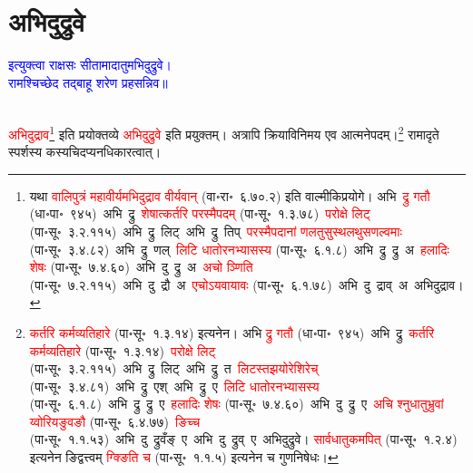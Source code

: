 \section[अभिदुद्रुवे]{अभिदुद्रुवे}
\centering\textcolor{blue}{इत्युक्त्वा राक्षसः सीतामादातुमभिदुद्रुवे।\nopagebreak\\
रामश्चिच्छेद तद्बाहू शरेण प्रहसन्निव॥}\nopagebreak\\
\\
\fontsize{14}{21}\selectfont\begin{sloppypar}\justifying\noindent\hspace{10mm} \textcolor{red}{अभिदुद्राव}\footnote{यथा \textcolor{red}{वालिपुत्रं महावीर्यमभिदुद्राव वीर्यवान्} (वा॰रा॰~६.७०.२) इति वाल्मीकि\-प्रयोगे। अभि~\textcolor{red}{द्रु गतौ} (धा॰पा॰~९४५)~\arrow अभि~द्रु~\arrow \textcolor{red}{शेषात्कर्तरि परस्मैपदम्} (पा॰सू॰~१.३.७८)~\arrow \textcolor{red}{परोक्षे लिट्} (पा॰सू॰~३.२.११५)~\arrow अभि~द्रु~लिट्~\arrow अभि~द्रु~तिप्~\arrow \textcolor{red}{परस्मैपदानां णलतुसुस्थलथुसणल्वमाः} (पा॰सू॰~३.४.८२)~\arrow अभि~द्रु~णल्~\arrow \textcolor{red}{लिटि धातोरनभ्यासस्य} (पा॰सू॰~६.१.८)~\arrow अभि~द्रु~द्रु~अ~\arrow \textcolor{red}{हलादिः शेषः} (पा॰सू॰~७.४.६०)~\arrow अभि~दु~द्रु~अ~\arrow \textcolor{red}{अचो ञ्णिति} (पा॰सू॰~७.२.११५)~\arrow अभि~दु~द्रौ~अ~\arrow \textcolor{red}{एचोऽयवायावः} (पा॰सू॰~६.१.७८)~\arrow अभि~दु~द्राव्~अ~\arrow अभिदुद्राव।} इति प्रयोक्तव्ये \textcolor{red}{अभिदुद्रुवे} इति प्रयुक्तम्। अत्रापि क्रिया\-विनिमय एव आत्मनेपदम्।\footnote{\textcolor{red}{कर्तरि कर्म\-व्यतिहारे} (पा॰सू॰~१.३.१४) इत्यनेन। अभि \textcolor{red}{द्रु गतौ} (धा॰पा॰~९४५)~\arrow अभि~द्रु~\arrow \textcolor{red}{कर्तरि कर्म\-व्यतिहारे} (पा॰सू॰~१.३.१४)~\arrow \textcolor{red}{परोक्षे लिट्} (पा॰सू॰~३.२.११५)~\arrow अभि~द्रु~लिट्~\arrow अभि~द्रु~त~\arrow \textcolor{red}{लिटस्तझयोरेशिरेच्} (पा॰सू॰~३.४.८१)~\arrow अभि~द्रु~एश्~\arrow अभि~द्रु~ए~\arrow \textcolor{red}{लिटि धातोरनभ्यासस्य} (पा॰सू॰~६.१.८)~\arrow अभि~द्रु~द्रु~ए~\arrow \textcolor{red}{हलादिः शेषः} (पा॰सू॰~७.४.६०)~\arrow अभि~दु~द्रु~ए~\arrow \textcolor{red}{अचि श्नुधातुभ्रुवां य्वोरियङुवङौ} (पा॰सू॰~६.४.७७)~\arrow \textcolor{red}{ङिच्च} (पा॰सू॰~१.१.५३)~\arrow अभि~दु~द्रुवँङ्~ए~\arrow अभि~दु~द्रुव्~ए~\arrow अभिदुद्रुवे। \textcolor{red}{सार्वधातुकमपित्} (पा॰सू॰~१.२.४) इत्यनेन ङिद्वत्त्वम् \textcolor{red}{ग्क्ङिति च} (पा॰सू॰~१.१.५) इत्यनेन च गुणनिषेधः।} रामादृते स्पर्शस्य कस्यचिदप्यनधिकारत्वात्।\end{sloppypar}
